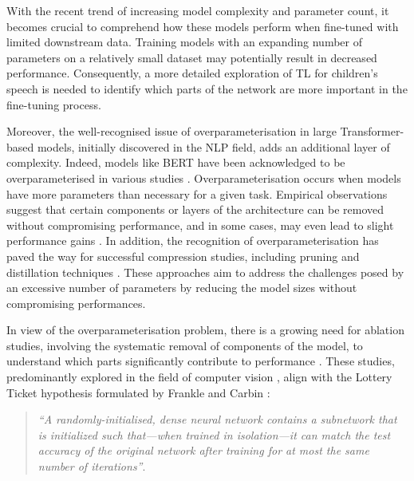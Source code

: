 With the recent trend of increasing model complexity and parameter count, it becomes crucial to comprehend how these models perform when fine-tuned with limited downstream data. Training models with an expanding number of parameters on a relatively small dataset may potentially result in decreased performance. Consequently, a more detailed exploration of \ac{TL} for children's speech is needed to identify which parts of the network are more important in the fine-tuning process.

Moreover, the well-recognised issue of overparameterisation in large Transformer-based models, initially discovered in the \ac{NLP} field, adds an additional layer of complexity. Indeed, models like BERT \cite{Bert} have been acknowledged to be overparameterised in various studies \cite{kovaleva-etal-2019-revealing,michel2019sixteen}. Overparameterisation occurs when models have more parameters than necessary for a given task. Empirical observations suggest that certain components or layers of the architecture can be removed without compromising performance, and in some cases, may even lead to slight performance gains \cite{kovaleva-etal-2019-revealing,michel2019sixteen,ye2023partial}. In addition, the recognition of overparameterisation has paved the way for successful compression studies, including pruning and distillation techniques \cite{mccarley2019structured,sanh2019distilbert}. These approaches aim to address the challenges posed by an excessive number of parameters by reducing the model sizes without compromising performances. 

In view of the overparameterisation problem, there is a growing need for ablation studies, involving the systematic removal of components of the model, to understand which parts significantly contribute to performance \cite{shen2021partial,wang2021fine}. These studies, predominantly explored in the field of computer vision \cite{ye2023partial}, align with the Lottery Ticket hypothesis formulated by Frankle and Carbin \cite{frankle2018lottery}:

\begin{quote}
    \textit{``A randomly-initialised, dense neural network contains a subnetwork that is initialized such that—when trained in isolation—it can match the test accuracy of the original network after training for at most the same number of iterations''}.
\end{quote}

